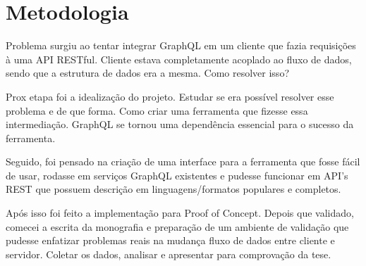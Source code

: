 \section[Metodologia]{Metodologia}

Problema surgiu ao tentar integrar GraphQL em um cliente que fazia requisições à uma API RESTful. Cliente estava completamente acoplado ao fluxo de dados, sendo que a estrutura de dados era a mesma. Como resolver isso?

Prox etapa foi a idealização do projeto. Estudar se era possível resolver esse problema e de que forma. Como criar uma ferramenta que fizesse essa intermediação. GraphQL se tornou uma dependência essencial para o sucesso da ferramenta.

Seguido, foi pensado na criação de uma interface para a ferramenta que fosse fácil de usar, rodasse em serviços GraphQL existentes e pudesse funcionar em API's REST que possuem descrição em linguagens/formatos populares e completos.

Após isso foi feito a implementação para Proof of Concept. Depois que validado, comecei a escrita da monografia e preparação de um ambiente de validação que pudesse enfatizar problemas reais na mudança fluxo de dados entre cliente e servidor. Coletar os dados, analisar e apresentar para comprovação da tese.